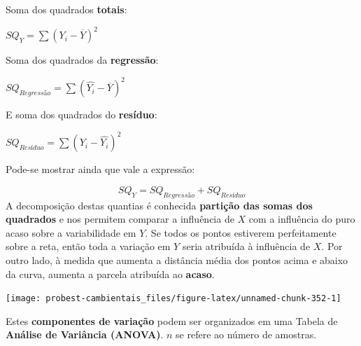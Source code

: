 \documentclass[
]{book}
\begin{document}
Soma dos quadrados \textbf{totais}:

\(SQ_Y = \sum{(Y_i - \overline{Y})^2}\)

Soma dos quadrados da \textbf{regressão}:

\(SQ_{Regressão}= \sum{(\hat{Y_i} - \overline{Y})^2}\)

E soma dos quadrados do \textbf{resíduo}:

\(SQ_{Resíduo}= \sum{(Y_i - \hat{Y_i})^2}\)

Pode-se mostrar ainda que vale a expressão:

\[SQ_Y = SQ_{Regressão} + SQ_{Resíduo}\]
A decomposição destas quantias é conhecida \textbf{partição das somas dos quadrados} e nos permitem comparar a influência de \(X\) com a influência do puro acaso sobre a variabilidade em \(Y\). Se todos os pontos estiverem perfeitamente sobre a reta, então toda a variação em \(Y\) seria atribuída à influência de \(X\). Por outro lado, à medida que aumenta a distância média dos pontos acima e abaixo da curva, aumenta a parcela atribuída ao \textbf{acaso}.

\begin{center}\texttt{[image: probest-cambientais\_files/figure-latex/unnamed-chunk-352-1]} \end{center}

Estes \textbf{componentes de variação} podem ser organizados em uma Tabela de \textbf{Análise de Variância (ANOVA)}. \(n\) se refere ao número de amostras.
\end{document}
